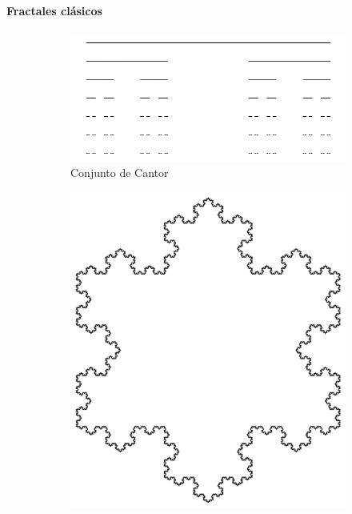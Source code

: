 \begin{frame}{\insertsectionhead}
\framesubtitle{Fractales clásicos}

\begin{figure}[ht!]
    \begin{subfigure}[b]{0.3\textwidth}
      \includegraphics[width=\textwidth]{screenshots/Cantor.png}
      \caption*{Conjunto de Cantor}
    \end{subfigure}
    \hspace{\fill}
    \begin{subfigure}[b]{0.2\textwidth}
      \includegraphics[width=\textwidth]{screenshots/Koch.png}

\end{subfigure}
\end{figure}
\end{frame}
